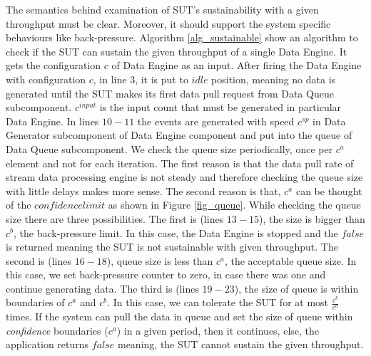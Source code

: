 The semantics behind  examination of SUT's sustainability with a given throughput must be clear. Moreover, it should support the system specific behaviours like back-pressure. Algorithm \ref{alg_sustainable} show an algorithm to check if the  SUT can sustain  the given throughput of a single Data Engine. It gets the configuration $c$ of Data Engine as an input. After firing the Data Engine with configuration $c$, in line $3$, it is put to $idle$ position, meaning no data is generated until the SUT makes its first data pull request from Data Queue subcomponent. $c^{input}$ is the input count that must be generated in particular Data Engine.
 In lines $10-11$ the events are generated with speed $c^{sp}$ in Data Generator subcomponent of Data Engine component and put into the queue of Data Queue subcomponent. We check the queue size periodically, once per $c^{a}$ element and not for each iteration. The first reason is that the data pull rate of stream data processing engine is not steady and therefore checking the queue size with little delays makes more sense. The second reason is that, $c^{a}$ can be thought of the $confidence limit$ as shown in Figure \ref{fig_queue}. While checking the queue size there are three possibilities. The first is (lines $13-15$), the size is bigger than $c^{b}$, the back-pressure limit. In this case, the Data Engine is stopped and the $false$ is returned meaning the SUT is not sustainable with given throughput. The second is (lines $16-18$), queue size is less than $c^{a}$, the acceptable queue size. In this case, we set back-pressure counter to zero, in case there was one and continue generating data. The third is (lines $19-23$), the size   of queue is within boundaries of $c^{a}$ and $c^{b}$. In this case, we can tolerate the SUT for at most $\frac{c^{b}}{c^{a}}$ times. If the system can pull the data in queue and set the size of queue within \textit{confidence} boundaries ($c^{a}$) in a given period, then it continues, else, the application returns $false$ meaning, the SUT cannot sustain the given throughput. 

